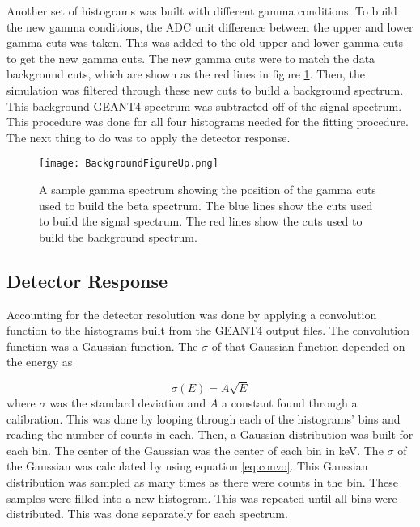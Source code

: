 \documentclass[../MaxHughesThesis.tex]{subfiles}
\begin{document}
Another set of histograms was built with different gamma conditions.
To build the new gamma conditions, the ADC unit difference between the upper and lower gamma cuts was taken.
This was added to the old upper and lower gamma cuts to get the new gamma cuts.
The new gamma cuts were to match the data background cuts, which are shown as the red lines in figure \ref{fig:backgroundsubbeta}. 
Then, the simulation was filtered through these new cuts to build a background spectrum.
This background GEANT4 spectrum was subtracted off of the signal spectrum.
This procedure was done for all four histograms needed for the fitting procedure.
The next thing to do was to apply the detector response. 

\begin{figure}[!htb]
        \centerline{\texttt{[image: BackgroundFigureUp.png]}}
        \caption{A sample gamma spectrum showing the position of the gamma cuts used to build the beta spectrum.
		 The blue lines show the cuts used to build the signal spectrum.
		 The red lines show the cuts used to build the background spectrum.
                   }
        \label{fig:backgroundsubbeta}
\end{figure}
\subsection{Detector Response}
\label{sec:convolution}
Accounting for the detector resolution was done by applying a convolution function to the histograms built from the GEANT4 output files.
The convolution function was a Gaussian function. 
The $\sigma$ of that Gaussian function depended on the energy as

\begin{equation}
	\sigma(E) = A\sqrt{E}
	\label{eq:convo}
\end{equation}
where $\sigma$ was the standard deviation and $A$ a constant found through a calibration.
This was done by looping through each of the histograms' bins and reading the number of counts in each.
Then, a Gaussian distribution was built for each bin.
The center of the Gaussian was the center of each bin in keV.
The $\sigma$ of the Gaussian was calculated by using equation \ref{eq:convo}.
This Gaussian distribution was sampled as many times as there were counts in the bin.
These samples were filled into a new histogram.
This was repeated until all bins were distributed.
This was done separately for each spectrum. 
\end{document}
